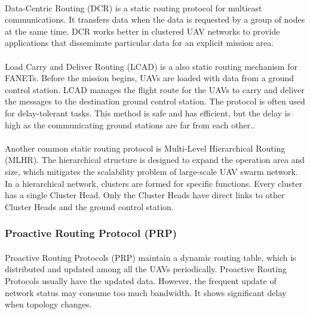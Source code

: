 \documentclass[a4paper,12pt]{report}
\begin{document}
\paragraph{}
Data-Centric Routing (DCR) is a static routing protocol for multicast communications. It transfers data when the data is requested by a group of nodes at the same time. DCR works better in clustered UAV networks to provide applications that disseminate particular data for an explicit mission area\cite{topobased}.

\paragraph{}
Load Carry and Deliver Routing (LCAD) is a also static routing mechanism for FANETs. Before the mission begins, UAVs are loaded with data from a ground control station. LCAD manages the flight route for the UAVs to carry and deliver the messages to the destination ground control station. The protocol is often used for delay-tolerant tasks. This method is safe and has efficient\cite{kung2008research, Yanmaz2018DroneNC, topobased}, but the delay is high as the communicating ground stations are far from each other.\cite{kung2008research, Yanmaz2018DroneNC, topobased}.

\paragraph{}
Another common static routing protocol is Multi-Level Hierarchical Routing (MLHR). The hierarchical structure is designed to expand the operation area and size, which mitigates the scalability problem of large-scale UAV swarm network\cite{guillen2021comparative}. In a hierarchical network, clusters are formed for specific functions. Every cluster has a single Cluster Head. Only the Cluster Heads have direct links to other Cluster Heads and the ground control station.

\subsubsection{Proactive Routing Protocol (PRP)}
\paragraph{}
Proactive Routing Protocols (PRP) maintain a dynamic routing table, which is distributed and updated among all the UAVs periodically. Proactive Routing Protocols usually have the updated data. However, the frequent update of network status may consume too much bandwidth. It shows significant delay when topology changes\cite{7995044}.
\end{document}
